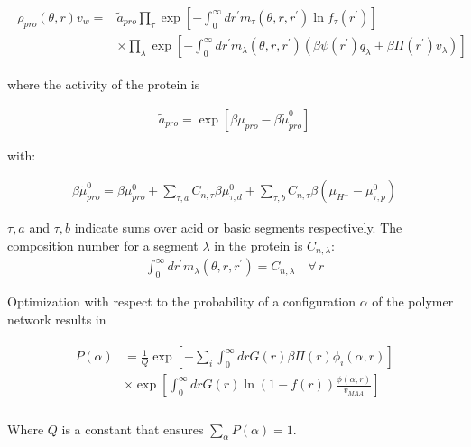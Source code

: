 \documentclass[journal=jacsat,manuscript=suppinfo]{achemso}
\begin{document}
	
	
	\begin{align}
		\begin{aligned}
			\rho_{pro}(\theta, r)v_w = & \tilde{a}_{pro} \prod_\tau \exp\left[ -\int_0^\infty dr^\prime  m_\tau(\theta,r,r^\prime) \ln f_\tau(r^\prime)\right] \\
			& \times \prod_\lambda \exp\left[ -\int_0^\infty dr^\prime  m_\lambda(\theta,r,r^\prime)\left( \beta\psi(r^\prime) q_\lambda + \beta \Pi(r^\prime) v_\lambda \right)\right]
		\end{aligned}
		\label{eq:si:rho-pro}
	\end{align}
	
	\noindent where the activity of the protein is
	
	\begin{align}
		\tilde{a}_{pro} = \exp[\beta\mu_{pro} - \beta\tilde{\mu}^0_{pro}]
	\end{align}
	
	with:
	
	\begin{align}
		\beta\tilde{\mu}^0_{pro} =  \beta \mu^0_{pro}  + \sum_{\tau,a} C_{n,\tau}\beta\mu^0_{\tau,d} 
		+ \sum_{\tau,b} C_{n,\tau}\beta(\mu_{H^+} - \mu^0_{\tau,p})
	\end{align}
	
	
	\noindent $\tau,a$ and $\tau,b$ indicate sums over acid or basic segments respectively.
	The composition number for a segment $\lambda$ in the protein is $C_{n,\lambda}$:
	\begin{align}
		\int_0^\infty dr^\prime  m_\lambda(\theta,r,r^\prime) = C_{n,\lambda}\quad \forall \, r
		\label{si:eq:composition}
	\end{align}
	
	
	Optimization with respect to the probability of a configuration $\alpha$ of the polymer network  results in
	
	\begin{align}
		\begin{aligned}
			P(\alpha)&=\frac{1}{Q}\exp\left[- \sum_i{\int_0^\infty{drG(r)\beta\Pi(r)\phi_i(\alpha,r)}}\right] \\
			& \times \exp\left[\int_0^\infty{ drG(r)\ln(1-f(r))\frac{\phi(\alpha,r)}{v_{MAA}}}\right] \\
		\end{aligned}
		\label{eq:si:proba-alfa}
	\end{align}
	
	\noindent Where $Q$ is a constant that ensures $\sum_\alpha P(\alpha) = 1$.
	
\end{document}
